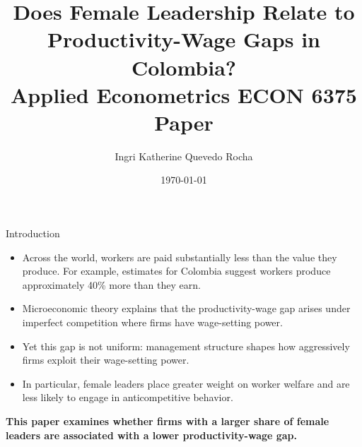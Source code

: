 \documentclass[11pt,aspectratio=169]{beamer}
\title{Does Female Leadership Relate to Productivity-Wage Gaps in Colombia? \\
{\small Applied Econometrics ECON 6375 Paper}}
\author{Ingri Katherine Quevedo Rocha}
\institute{\small \url{ingriq@gwu.edu} \\ George Washington University \\ M.S.\ Applied Economics (Spring 2026)}
\date{\today}
\begin{document}
 
\begin{frame}
  \titlepage
\end{frame}

\begin{frame}{Introduction}
\begin{itemize}
  \item Across the world, workers are paid substantially less than the value they produce. For example, estimates for Colombia suggest workers produce approximately 40\% more than they earn.
  \item Microeconomic theory explains that the productivity-wage gap arises under imperfect competition where firms have wage-setting power.
  \item Yet this gap is not uniform: management structure shapes how aggressively firms exploit their wage-setting power.
  \item In particular, female leaders place greater weight on worker welfare and are less likely to engage in anticompetitive behavior.
\end{itemize}
\vspace{0.5em}
\textbf{This paper examines whether firms with a larger share of female leaders are associated with a lower productivity-wage gap.}
\end{frame}
\end{document}
